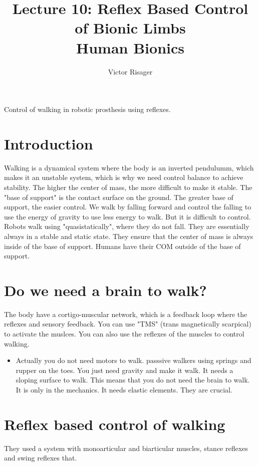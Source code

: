 \documentclass[a4paper]{article}
\title{Lecture 10: Reflex Based Control of Bionic Limbs  \\
	\large Human Bionics}
\author{Victor Risager}
\begin{document}
\maketitle

Control of walking in robotic prosthesis using reflexes.

\section{Introduction}
Walking is a dynamical system where the body is an inverted pendulumm, which makes it an unstable system, which is why we need control balance to achieve stability. The higher the center of mass, the more difficult to make it stable. The "base of support" is the contact surface on the ground. The greater base of support, the easier control. We walk by falling forward and control the falling to use the energy of gravity to use less energy to walk. But it is difficult to control. 
Robots walk using "quasistatically", where they do not fall. They are essentially always in a stable and static state. They ensure that the center of mass is always inside of the base of support. Humans have their COM outside of the base of support.  

\section{Do we need a brain to walk?}
The body have a cortigo-muscular network, which is a feedback loop where the reflexes and sensory feedback. You can use "TMS" (trans magnetically scarpical) to activate the muslces. You can also use the reflexes of the muscles to control walking. 
\begin{itemize}
	\item Actually you do not need motors to walk. passsive walkers using springs and rupper on the toes. You just need gravity and make it walk. It needs a sloping surface to walk. This means that you do not need the brain to walk. It is only in the mechanics. It needs elastic elements. They are crucial.
\end{itemize}

\section{Reflex based control of walking} 
They used a system with monoarticular and biarticular muscles, stance reflexes and swing reflexes that. 
\end{document}
